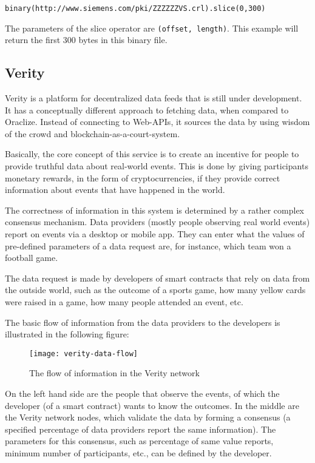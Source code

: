 \texttt{binary(http://www.siemens.com/pki/ZZZZZZVS.crl).slice(0,300)}

The parameters of the slice operator are \texttt{(offset, length)}. This example will return the first 300 bytes in this binary file.
\subsection{Verity}
Verity is a platform for decentralized data feeds that is still under development. It has a conceptually different approach to fetching data, when compared to Oraclize. Instead of connecting to Web-APIs, it sources the data by using wisdom of the crowd and blockchain-as-a-court-system\cite{veritywhitepaper}.

Basically, the core concept of this service is to create an incentive for people to provide truthful data about real-world events. This is done by giving participants monetary rewards, in the form of cryptocurrencies, if they provide correct information about events that have happened in the world.

The correctness of information in this system is determined by a rather complex consensus mechanism. Data providers (mostly people observing real world events) report on events via a desktop or mobile app. They can enter what the values of pre-defined parameters of a data request are, for instance, which team won a football game. 

The data request is made by developers of smart contracts that rely on data from the outside world, such as the outcome of a sports game, how many yellow cards were raised in a game, how many people attended an event, etc. 

The basic flow of information from the data providers to the developers is illustrated in the following figure:
\begin{figure}[H]
\centering
\texttt{[image: verity-data-flow]}
\caption{The flow of information in the Verity network\cite{veritywhitepaper}}
\end{figure}

On the left hand side are the people that observe the events, of which the developer (of a smart contract) wants to know the outcomes. In the middle are the Verity network nodes, which validate the data by forming a consensus (\eg a specified percentage of data providers report the same information). The parameters for this consensus, such as percentage of same value reports, minimum number of participants, etc., can be defined by the developer. 

